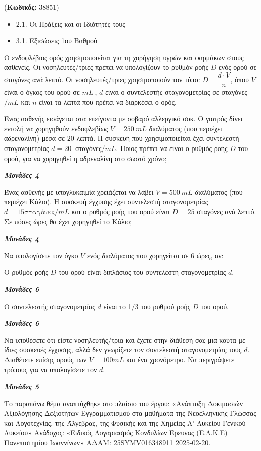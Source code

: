 \documentclass[11pt,a4paper,twoside]{book}
\newcounter{askhsh}[chapter]
\renewcommand{\theaskhsh}{
	\bf{\titlefont{\Large{\thechapter}}.\arabic{askhsh}}
}
\newcommand{\Askhsh}[2]{\refstepcounter{askhsh}{\titlefont{Άσκηση\theaskhsh} - \textcolor{maincolor}{ΘΕΜΑ #2}} ({\small{\textbf{Κωδικός:} #1}})\\}{}
\newenvironment{ylh}{
\begin{tcolorbox}[
breakable,
enhanced standard,
titlerule=0pt,
toprule=0pt, 
rightrule=0pt, 
bottomrule=0pt,
title={\titlefont Ύλη άσκησης},
colback=white,
opacityback=0,
left=2mm,
top=1mm,
bottom=0mm,
boxrule=0pt,
colframe=white,
borderline west={1.5mm}{0pt}{secondarycolor},
leftrule=2mm,
sharp corners,
coltitle=black
]
\begin{itemize}[leftmargin=3mm, itemsep=0mm, label=\textcolor{secondarycolor}{{\small\faBook}}]
}{
\end{itemize}
\end{tcolorbox}
}
\newcommand{\monades}[1]{
\hspace*{\fill}
\textbf{\textit{\textcolor{maincolor}{Μονάδες #1}}}}
\begin{document}
\vspace{4mm}
\Askhsh{38851}{4}
\begin{ylh}
    \item 2.1. Οι Πράξεις και οι Ιδιότητές τους
    \item 3.1. Εξισώσεις 1ου Βαθμού
\end{ylh}

Ο ενδοφλέβιος ορός χρησιμοποιείται για τη χορήγηση υγρών και φαρμάκων στους ασθενείς. Οι νοσηλευτές/τριες πρέπει να υπολογίζουν το ρυθμόν ροής $D$ ενός ορού σε σταγόνες ανά λεπτό. Οι νοσηλευτές/τριες χρησιμοποιούν τον τύπο:
$D = \dfrac{d \cdot V}{n}$, όπου
$V$ είναι ο όγκος του ορού σε $mL\ $,
$d$ είναι ο συντελεστής σταγονομετρίας σε σταγόνες$/mL$ και
$n$ είναι τα λεπτά που πρέπει να διαρκέσει ο ορός.
\begin{alist}
\item

\begin{rlist}
\item Ένας ασθενής εισάγεται στα επείγοντα με σοβαρό αλλεργικό σοκ. Ο γιατρός δίνει εντολή να χορηγηθούν ενδοφλεβίως $V = 250\ mL$ διαλύματος (που περιέχει αδρεναλίνη) μέσα σε $20$ λεπτά. Η συσκευή που χρησιμοποιείται έχει συντελεστή σταγονομετρίας $d = 20\ $ σταγόνες$/mL$. Ποιος πρέπει να είναι ο ρυθμός ροής $D$ του ορού, για να χορηγηθεί η αδρεναλίνη στο σωστό χρόνο;

\monades{4}
\item Ένας ασθενής με υπογλυκαιμία χρειάζεται να λάβει $V = 500\ mL$ διαλύματος (που περιέχει Κάλιο). Η συσκευή έγχυσης έχει συντελεστή σταγονομετρίας $d = 15\text{σταγόνες}/mL$ και ο ρυθμός ροής του ορού είναι $D = 25$ σταγόνες ανά λεπτό. Σε πόσες ώρες θα έχει χορηγηθεί το Κάλιο;
\monades{4}
\end{rlist}
\item Να υπολογίσετε τον όγκο $V$ ενός διαλύματος που χορηγείται σε $6$ ώρες, αν:

\begin{rlist}
\item Ο ρυθμός ροής $D$ του ορού είναι διπλάσιος του συντελεστή σταγονομετρίας $d$.

\monades{6}
\item Ο συντελεστής σταγονομετρίας $d$ είναι το 1/3 του ρυθμού ροής $D$ του ορού.

\monades{6}
\end{rlist}
\item Να υποθέσετε ότι είστε νοσηλευτής/τρια και έχετε στην διάθεσή σας μια κούτα με ίδιες συσκευές έγχυσης, αλλά δεν γνωρίζετε τον συντελεστή σταγονομετρίας τους $d$. Διαθέτετε επίσης ορούς των $V = 100mL$ και ένα χρονόμετρο. Να περιγράψετε τρόπους για να υπολογίσετε τον $d$.
\monades{5}

{\footnotesize Το παραπάνω θέμα αναπτύχθηκε στο πλαίσιο του έργου: «Ανάπτυξη Δοκιμασιών Αξιολόγησης Δεξιοτήτων Εγγραμματισμού στα μαθήματα της Νεοελληνικής Γλώσσας και Λογοτεχνίας, της Άλγεβρας, της Φυσικής και της Χημείας Α' Λυκείου Γενικού Λυκείου» Ανάδοχος: «Ειδικός Λογαριασμός Κονδυλίων Έρευνας (Ε.Λ.Κ.Ε) Πανεπιστημίου Ιωαννίνων» ΑΔΑΜ: 25SYMV016348911 2025-02-20.}
\end{alist}
\end{document}
